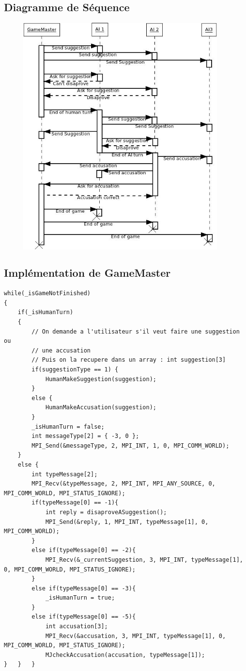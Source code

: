 \documentclass[a4paper,10pt]{article}
\begin{document}
	\subsection{Diagramme de Séquence}\hypertarget{seqDiag}{}
		\begin{figure}[H] \hspace*{-2cm} 
    	\centering
   		  \includegraphics[width=300pt]{Diag-Sequence.jpeg} 
	  	\end{figure}	 
	 


 \subsection{Implémentation de GameMaster} 	\hypertarget{GameMasterImplementation}{}

		\begin{lstlisting}
while(_isGameNotFinished)
{
	if(_isHumanTurn)
	{
		// On demande a l'utilisateur s'il veut faire une suggestion ou 
		// une accusation
		// Puis on la recupere dans un array : int suggestion[3]
		if(suggestionType == 1) {
			HumanMakeSuggestion(suggestion);
		}
		else {
			HumanMakeAccusation(suggestion);
		}
		_isHumanTurn = false;
		int messageType[2] = { -3, 0 };
		MPI_Send(&messageType, 2, MPI_INT, 1, 0, MPI_COMM_WORLD);
	} 
	else {
		int typeMessage[2];
		MPI_Recv(&typeMessage, 2, MPI_INT, MPI_ANY_SOURCE, 0, MPI_COMM_WORLD, MPI_STATUS_IGNORE);
		if(typeMessage[0] == -1){
			int reply = disaproveASuggestion();
			MPI_Send(&reply, 1, MPI_INT, typeMessage[1], 0, MPI_COMM_WORLD);
		}
		else if(typeMessage[0] == -2){
			MPI_Recv(&_currentSuggestion, 3, MPI_INT, typeMessage[1], 0, MPI_COMM_WORLD, MPI_STATUS_IGNORE);		
		}
		else if(typeMessage[0] == -3){
			_isHumanTurn = true;
		}
		else if(typeMessage[0] == -5){
			int accusation[3];
			MPI_Recv(&accusation, 3, MPI_INT, typeMessage[1], 0, MPI_COMM_WORLD, MPI_STATUS_IGNORE);
			MJcheckAccusation(accusation, typeMessage[1]);
}	}	}
\end{lstlisting}
\fontfamily{}	
	
\end{document}
